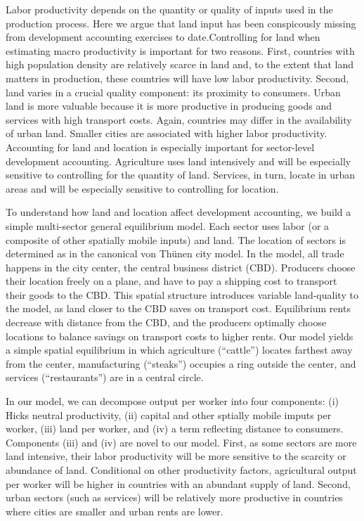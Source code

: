 \documentclass[12pt]{article}
\begin{document}
Labor productivity depends on the quantity or quality of inputs used in the production process. Here we argue that land input has been conspicously missing from development accounting exercises to date.Controlling for land when estimating macro productivity is important for two reasons. First, countries with high population density are relatively scarce in land and, to the extent that land matters in production, these countries will have low labor productivity. Second, land varies in a crucial quality component: its proximity to consumers. Urban land is more valuable because it is more productive in producing goods and services with high transport costs. Again, countries may differ in the availability of urban land. Smaller cities are associated with higher labor productivity. Accounting for land and location is especially important for sector-level development accounting. Agriculture uses land intensively and will be especially sensitive to controlling for the quantity of land. Services, in turn, locate in urban areas and will be especially sensitive to controlling for location.

To understand how land and location affect development accounting, we build a simple multi-sector general equilibrium model. Each sector uses labor (or a composite of other spatially mobile inputs) and land. The location of sectors is determined as in the canonical von Thünen city model. In the model, all trade happens in the city center, the central business district (CBD). Producers choose their location freely on a plane, and have to pay a shipping cost to transport their goods to the CBD. This spatial structure introduces variable land-quality to the model, as land closer to the CBD saves on transport cost. Equilibrium rents decrease with distance from the CBD, and the producers optimally choose locations to balance savings on transport costs to higher rents. Our model yields a simple spatial equilibrium in which agriculture (``cattle'') locates farthest away from the center, manufacturing (``steaks'') occupies a ring outside the center, and services (``restaurants'') are in a central circle.

In our model, we can decompose output per worker into four components: (i) Hicks neutral productivity, (ii) capital and other sptially mobile imputs per worker, (iii) land per worker, and (iv) a term reflecting distance to consumers. Components (iii) and (iv) are novel to our model. First, as some sectors are more land intensive, their labor productivity will be more sensitive to the scarcity or abundance of land. Conditional on other productivity factors, agricultural output per worker will be higher in countries with an abundant supply of land. Second, urban sectors (such as services) will be relatively more productive in countries where cities are smaller and urban rents are lower.
\end{document}
